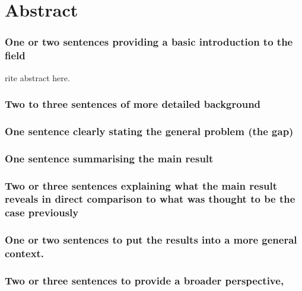 \clearpage







\section{Abstract}


\subsubsection{One or two sentences providing a basic introduction to the field}
rite abstract here.


\subsubsection{Two to three sentences of more detailed background}


\subsubsection{One sentence clearly stating the general problem (the gap)}


\subsubsection{One sentence summarising the main result}


\subsubsection{Two or three sentences explaining what the main result reveals in direct comparison to what was thought to be the case previously}


\subsubsection{One or two sentences to put the results into a more general context.}



\subsubsection{Two or three sentences to provide a broader perspective, }



